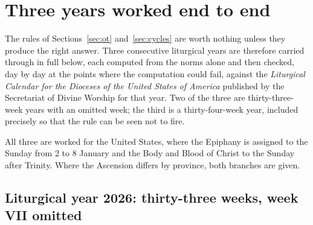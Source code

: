 \section{Three years worked end to end}
\label{sec:years}

The rules of Sections~\ref{sec:ot} and~\ref{sec:cycles} are worth nothing unless they produce the right answer.
Three consecutive liturgical years are therefore carried through in full below, each computed from
the norms alone and then checked, day by day at the points where the computation could fail, against
the \emph{Liturgical Calendar for the Dioceses of the United States of America} published by the
Secretariat of Divine Worship for that year. Two of the three are thirty-three-week years with an
omitted week; the third is a thirty-four-week year, included precisely so that the rule can be seen
not to fire.

All three are worked for the United States, where the Epiphany is assigned to the Sunday from 2 to 8
January and the Body and Blood of Christ to the Sunday after Trinity. Where the Ascension differs by
province, both branches are given.

\subsection{Liturgical year 2026: thirty-three weeks, week VII omitted}

